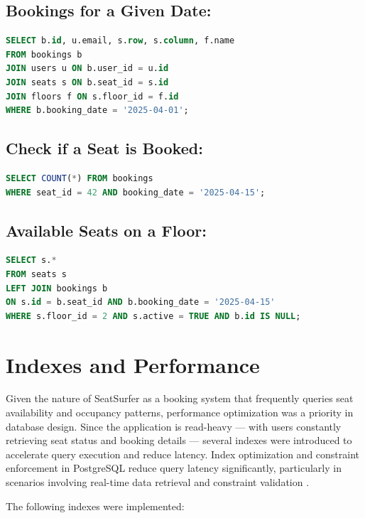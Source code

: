 \documentclass[12pt,a4paper]{report} %
\begin{document}
\subsection*{Bookings for a Given Date:}

\begin{lstlisting}[language=SQL]
SELECT b.id, u.email, s.row, s.column, f.name
FROM bookings b
JOIN users u ON b.user_id = u.id
JOIN seats s ON b.seat_id = s.id
JOIN floors f ON s.floor_id = f.id
WHERE b.booking_date = '2025-04-01';
\end{lstlisting}

\subsection*{Check if a Seat is Booked:}

\begin{lstlisting}[language=SQL]
SELECT COUNT(*) FROM bookings
WHERE seat_id = 42 AND booking_date = '2025-04-15';
\end{lstlisting}

\subsection*{Available Seats on a Floor:}

\begin{lstlisting}[language=SQL]
SELECT s.*
FROM seats s
LEFT JOIN bookings b
ON s.id = b.seat_id AND b.booking_date = '2025-04-15'
WHERE s.floor_id = 2 AND s.active = TRUE AND b.id IS NULL;
\end{lstlisting}

\section{Indexes and Performance}

Given the nature of SeatSurfer as a booking system that frequently queries seat availability and occupancy patterns, performance optimization was a priority in database design. Since the application is read-heavy — with users constantly retrieving seat status and booking details — several indexes were introduced to accelerate query execution and reduce latency. Index optimization and constraint enforcement in PostgreSQL reduce query latency significantly, particularly in scenarios involving real-time data retrieval and constraint validation \cite{lee2022postgisi}.

The following indexes were implemented:
\end{document}
